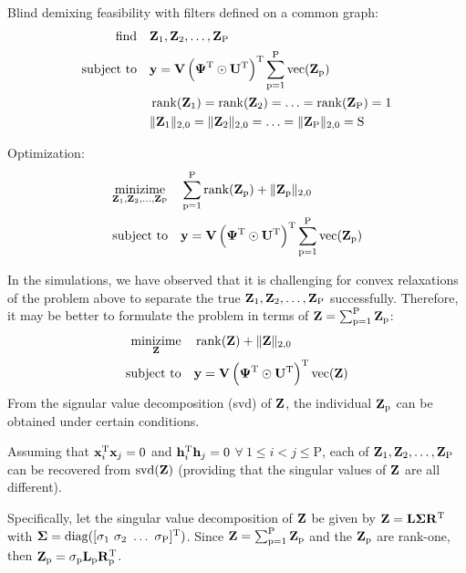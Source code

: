 \documentclass{article}
\newcommand{\numSources}{\text{P}}
\newcommand{\sourceIndex}{\text{p}}
\DeclareMathOperator{\diag}{diag}
\DeclareMathOperator{\rank}{rank}
\DeclareMathOperator{\svd}{svd}
\DeclareMathOperator{\vect}{vec}
\begin{document}
Blind demixing feasibility with filters defined on a common graph:
\begin{align}
  \mathop{\text{find}} \quad & \bbZ_{1}, \bbZ_{2}, \ldots, \bbZ_{\numSources} \\
  \text{subject to} \quad & \bby = \bbV \left(\bbPsi^{\rmT} \odot \bbU^{\rmT} \right)^{\rmT}\sum_{\sourceIndex=1}^{\numSources} \vect(\bbZ_{\sourceIndex}) \nonumber \\
  & \rank(\bbZ_{1}) = \rank(\bbZ_{2}) = \ldots = \rank(\bbZ_{\numSources}) = 1 \nonumber \\
  & \|\bbZ_{1}\|_{2,0} = \|\bbZ_{2}\|_{2,0} = \ldots = \|\bbZ_{\numSources}\|_{2,0} = \rmS \nonumber
\end{align}

Optimization:
\begin{align}
  \mathop{\text{minizime}}_{\bbZ_{1},\bbZ_{2},\ldots,\bbZ_{\numSources}} \quad & \sum_{\sourceIndex=1}^{\numSources} \rank(\bbZ_{\sourceIndex}) + \|\bbZ_{\sourceIndex}\|_{2,0} \\
  \text{subject to} \quad & \bby = \bbV \left(\bbPsi^{\rmT} \odot \bbU^{\rmT} \right)^{\rmT}\sum_{\sourceIndex=1}^{\numSources} \vect(\bbZ_{\sourceIndex}) \nonumber
\end{align}

In the simulations, we have observed that it is challenging for convex relaxations of the problem above to separate the true $\bbZ_{1},\bbZ_{2},\ldots,\bbZ_{\numSources}$ successfully. Therefore, it may be better to formulate the problem in terms of $\bbZ = \sum_{\sourceIndex=1}^{\numSources} \bbZ_{\sourceIndex}$:
%
\begin{align}
  \mathop{\text{minizime}}_{\bbZ} \quad & \rank(\bbZ) + \|\bbZ\|_{2,0} \\
  \text{subject to} \quad & \bby = \bbV \left(\bbPsi^{\rmT} \odot \bbU^{\rmT} \right)^{\rmT} \vect(\bbZ) \nonumber
\end{align}
%
From the signular value decomposition (svd) of ${\mathbf Z}$, the individual $\bbZ_{\sourceIndex}$ can be obtained under certain conditions.

Assuming that ${\mathbf x}_{i}^{{\text{T}}} {\mathbf x}_{j} = 0$ and ${\mathbf h}_{i}^{{\text{T}}} {\mathbf h}_{j} = 0$ $\forall \ 1 \leqslant i < j \leqslant \numSources$, each of $\bbZ_{1},\bbZ_{2},\ldots,\bbZ_{\numSources}$ can be recovered from $\svd(\bbZ)$ (providing that the singular values of ${\mathbf Z}$ are all different).

Specifically, let the singular value decomposition of ${\mathbf Z}$ be given by ${\mathbf Z} = {\mathbf L} \boldsymbol{\Sigma} {\mathbf R}^{{\text{T}}}$ with $\bbSigma = \diag([\sigma_1 \ \sigma_2 \ \ldots \ \sigma_{\numSources}]^{\rmT})$. Since $\bbZ = \sum_{\sourceIndex=1}^{\numSources} \bbZ_{\sourceIndex}$ and the $\bbZ_{\sourceIndex}$ are rank-one, then $\bbZ_{\sourceIndex} = \sigma_{\sourceIndex} \bbL_{\sourceIndex} \bbR_{\sourceIndex}^{\rmT}$.
\end{document}
